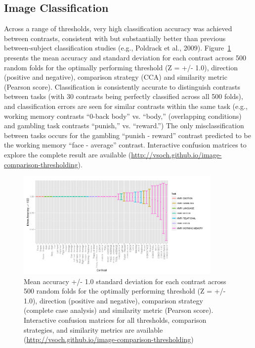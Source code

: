 \documentclass{report}
\begin{document}
\subsection{Image Classification}

Across a range of thresholds, very high classification accuracy was
achieved between contrasts, consistent with but substantially better
than previous between-subject classification studies (e.g., Poldrack et
al., 2009). Figure~\ref{fig:25} presents the mean accuracy and standard deviation
for each contrast across 500 random folds for the optimally performing
threshold (Z = +/- 1.0), direction (positive and negative), comparison
strategy (CCA) and similarity metric (Pearson score). Classification is
consistently accurate to distinguish contrasts between tasks (with 30
contrasts being perfectly classified across all 500 folds), and
classification errors are seen for similar contrasts within the same
task (e.g., working memory contrasts ``0-back body'' vs. ``body,''
(overlapping conditions) and gambling task contrasts ``punish,'' vs.
``reward.'') The only misclassification between tasks occurs for the
gambling ``punish - reward'' contrast predicted to be the working memory
``face - average'' contrast. Interactive confusion matrices to explore
the complete result are available
(\href{http://vsoch.github.io/image-comparison-thresholding}{http://vsoch.github.io/image-comparison-thresholding}).

\begin{figure}[ht!]
\begin{center}
\includegraphics[width=10cm]{images/figure25.png}
\end{center}
\caption{ \label{fig:25} Mean accuracy +/- 1.0 standard deviation for each contrast across 500 random folds for the optimally performing threshold (Z = +/- 1.0), direction (positive and negative), comparison strategy (complete case analysis) and similarity metric (Pearson score). Interactive confusion matrices for all thresholds, comparison strategies, and similarity metrics are available (\href{http://vsoch.github.io/image-comparison-thresholding}{http://vsoch.github.io/image-comparison-thresholding})
\newline \newline}
\end{figure} 
\end{document}
